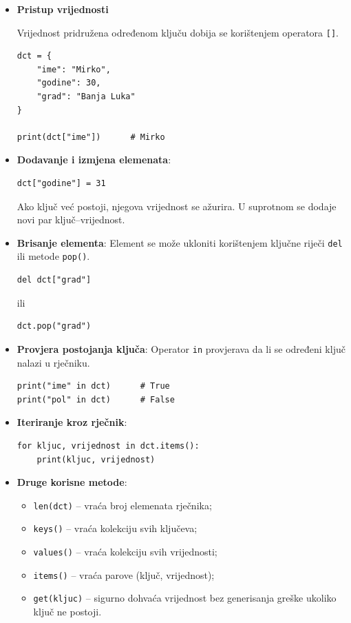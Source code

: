 \begin{itemize}
	
	\item \textbf{Pristup vrijednosti}
	
	Vrijednost pridružena određenom ključu dobija se korištenjem operatora \texttt{[]}.
	
	\begin{verbatim}
dct = {
    "ime": "Mirko",
    "godine": 30,
    "grad": "Banja Luka"
}

print(dct["ime"])      # Mirko
\end{verbatim}
	
	\item \textbf{Dodavanje i izmjena elemenata}: 
	\begin{verbatim}
dct["godine"] = 31
\end{verbatim}
	
	Ako ključ već postoji, njegova vrijednost se ažurira. U suprotnom se dodaje novi par ključ--vrijednost.
	
	\item \textbf{Brisanje elementa}: Element se može ukloniti korištenjem ključne riječi \texttt{del} ili metode \texttt{pop()}.
	
	\begin{verbatim}
del dct["grad"]
\end{verbatim}
	
	ili
	
	\begin{verbatim}
dct.pop("grad")
\end{verbatim}
	
	\item \textbf{Provjera postojanja ključa}:   Operator \texttt{in} provjerava da li se određeni ključ nalazi u rječniku.
	
	\begin{verbatim}
print("ime" in dct)      # True
print("pol" in dct)      # False
\end{verbatim}
	
	\item \textbf{Iteriranje kroz rječnik}:
	
	\begin{verbatim}
for kljuc, vrijednost in dct.items():
    print(kljuc, vrijednost)
\end{verbatim}
	
	\item \textbf{Druge korisne metode}: 
	
	\begin{itemize}
		\item \texttt{len(dct)} -- vraća broj elemenata rječnika;
		\item \texttt{keys()} -- vraća kolekciju svih ključeva;
		\item \texttt{values()} -- vraća kolekciju svih vrijednosti;
		\item \texttt{items()} -- vraća parove (ključ, vrijednost);
		\item \texttt{get(kljuc)} -- sigurno dohvaća vrijednost bez generisanja greške ukoliko ključ ne postoji.
	\end{itemize}
	
\end{itemize}

